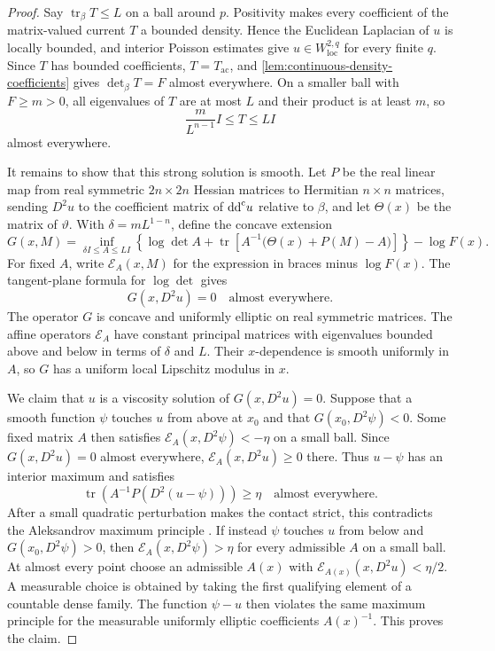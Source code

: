 \begin{proof}
Say $\operatorname{tr}_\beta T\leq L$ on a ball around $p$. Positivity makes every coefficient of the matrix-valued current $T$ a bounded density. Hence the Euclidean Laplacian of $u$ is locally bounded, and interior Poisson estimates give $u\in W^{2,q}_{\mathrm{loc}}$ for every finite $q$. Since $T$ has bounded coefficients, $T=T_{\mathrm{ac}}$, and \cref{lem:continuous-density-coefficients} gives $\det_\beta T=F$ almost everywhere. On a smaller ball with $F\geq m>0$, all eigenvalues of $T$ are at most $L$ and their product is at least $m$, so
\[
  \frac{m}{L^{n-1}}I\leq T\leq LI
\]
almost everywhere.

It remains to show that this strong solution is smooth. Let $P$ be the real linear map from real symmetric $2n\times2n$ Hessian matrices to Hermitian $n\times n$ matrices, sending $D^2u$ to the coefficient matrix of $\mathrm{dd}^{\mathrm{c}} u$ relative to $\beta$, and let $\Theta(x)$ be the matrix of $\vartheta$. With $\delta=mL^{1-n}$, define the concave extension
\[
  G(x,M)=\inf_{\delta I\leq A\leq LI}
  \left\{\log\det A+\operatorname{tr}\!\left[A^{-1}\bigl(\Theta(x)+P(M)-A\bigr)\right]\right\}-\log F(x).
\]
For fixed $A$, write $\mathcal E_A(x,M)$ for the expression in braces
minus $\log F(x)$. The tangent-plane formula for $\log\det$ gives
\[
  G(x,D^2u)=0\quad\text{almost everywhere}.
\]
The operator $G$ is concave and uniformly elliptic on real symmetric matrices. The affine operators $\mathcal E_A$ have constant principal matrices with eigenvalues bounded above and below in terms of $\delta$ and $L$. Their $x$-dependence is smooth uniformly in $A$, so $G$ has a uniform local Lipschitz modulus in $x$.

We claim that $u$ is a viscosity solution of $G(x,D^2u)=0$. Suppose that a smooth function $\psi$ touches $u$ from above at $x_0$ and that $G(x_0,D^2\psi)<0$. Some fixed matrix $A$ then satisfies $\mathcal E_A(x,D^2\psi)<-\eta$ on a small ball. Since $G(x,D^2u)=0$ almost everywhere, $\mathcal E_A(x,D^2u)\geq0$ there. Thus $u-\psi$ has an interior maximum and satisfies
\[
  \operatorname{tr}\!\left(A^{-1}P(D^2(u-\psi))\right)\geq\eta
  \quad\text{almost everywhere}.
\]
After a small quadratic perturbation makes the contact strict, this contradicts the Aleksandrov maximum principle \cite[Chapter~9, Theorem~9.1]{GT01}. If instead $\psi$ touches $u$ from below and $G(x_0,D^2\psi)>0$, then $\mathcal E_A(x,D^2\psi)>\eta$ for every admissible $A$ on a small ball. At almost every point choose an admissible $A(x)$ with $\mathcal E_{A(x)}(x,D^2u)<\eta/2$. A measurable choice is obtained by taking the first qualifying element of a countable dense family. The function $\psi-u$ then violates the same maximum principle for the measurable uniformly elliptic coefficients $A(x)^{-1}$. This proves the claim.


\end{proof}
